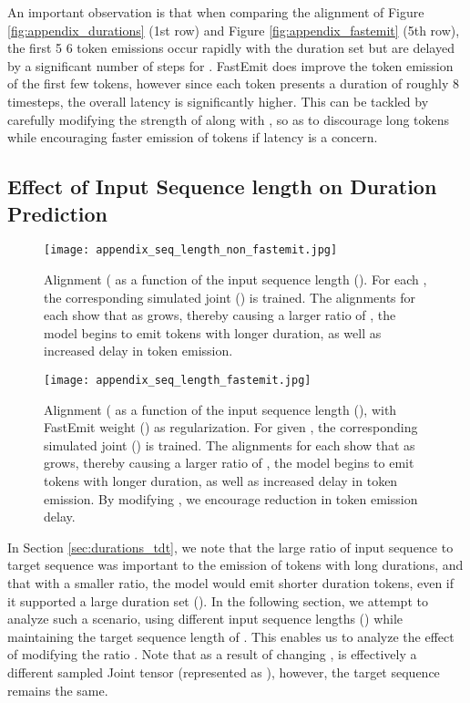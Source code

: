 \documentclass{article}
\begin{document}
An important observation is that when comparing the alignment of Figure \ref{fig:appendix_durations} (1st row) and Figure \ref{fig:appendix_fastemit} (5th row), the first 5  6 token emissions occur rapidly with the duration set  but are delayed by a significant number of steps for . FastEmit does improve the token emission of the first few tokens, however since each token presents a duration of roughly 8 timesteps, the overall latency is significantly higher. This can be tackled by carefully modifying the strength of  along with , so as to discourage long tokens while encouraging faster emission of tokens if latency is a concern.

\subsection{Effect of Input Sequence length on Duration Prediction}
\label{sec:seq_len_tdt}

\begin{figure}[t]
    \centering
    \texttt{[image: appendix\_seq\_length\_non\_fastemit.jpg]}
    \caption{Alignment ( as a function of the input sequence length (). For each , the corresponding simulated joint () is trained. The alignments for each  show that as  grows, thereby causing a larger ratio of , the model begins to emit tokens with longer duration, as well as increased delay in token emission.}
    \label{fig:appendix_seq_len_non_fastemit}
\end{figure}
\begin{figure}[h!]
    \centering
    \texttt{[image: appendix\_seq\_length\_fastemit.jpg]}
    \caption{Alignment ( as a function of the input sequence length (), with FastEmit weight () as regularization. For given , the corresponding simulated joint () is trained. The alignments for each  show that as  grows, thereby causing a larger ratio of , the model begins to emit tokens with longer duration, as well as increased delay in token emission. By modifying , we encourage reduction in token emission delay.}
    \label{fig:appendix_seq_len_fastemit}
\end{figure}



In Section \ref{sec:durations_tdt}, we note that the large ratio of input sequence to target sequence  was important to the emission of tokens with long durations, and that with a smaller ratio, the model would emit shorter duration tokens, even if it supported a large duration set (). In the following section, we attempt to analyze such a scenario, using different input sequence lengths () while maintaining the target sequence length of . This enables us to analyze the effect of modifying the ratio . Note that as a result of changing ,  is effectively a different sampled Joint tensor (represented as ), however, the target sequence  remains the same.
\end{document}

